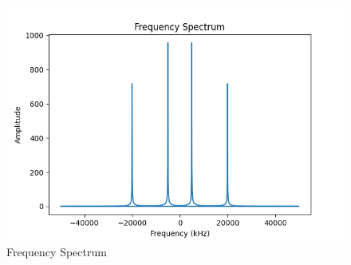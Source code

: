 \documentclass[journal,12pt,twocolumn]{IEEEtran}
\begin{document}
\begin{figure}[ht]
   \centering
   \includegraphics[width=1.1\columnwidth]{figs/fig2.png}
   \caption{Frequency Spectrum}
\end{figure}
\end{document}

